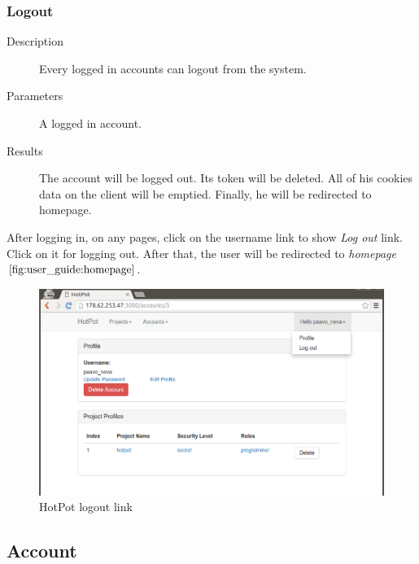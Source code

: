 \clearpage

\subsubsection{Logout}
\label{ch:appendix-a:user_guide:miscellaneous:logout}

\begin{description}
\item[Description] Every logged in accounts can logout from the system.
\item[Parameters] A logged in account.
\item[Results] The account will be logged out.
Its token will be deleted.
All of his cookies data on the client will be emptied.
Finally, he will be redirected to homepage.
\end{description}

After logging in, on any pages, click on the username link to show \emph{Log out} link.
Click on it for logging out.
After that, the user will be redirected to \emph{homepage} \(\autoref{fig:user_guide:homepage}\).

\begin{figure}[bth]                                                                                                                                                  \myfloatalign
\includegraphics[width=1.0\linewidth]{gfx/chapter_5/miscellaneous/logout}
\caption[HotPot logout link]{HotPot logout link}
\label{fig:user_guide:miscellaneous:logout}
\end{figure}


\subsection{Account}
\label{ch:appendix-a:user_guide:account}
